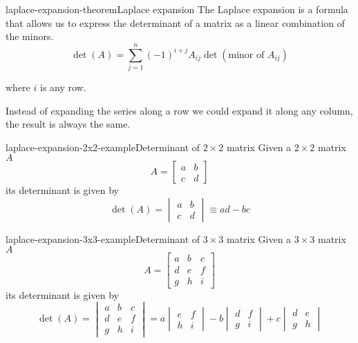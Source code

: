 \documentclass[preview]{standalone}
\begin{document}
\begin{snippettheorem}{laplace-expansion-theorem}{Laplace expansion}
    The Laplace expansion is a formula that allows us to express the determinant of
    a matrix as a linear combination of the minors.
    \[
        \det(A)=\sum_{j=1}^{n}{(-1)}^{i+j}A_{ij}\det(\text{minor of }A_{ij})
    \]

    where \(i\) is any row.

    Instead of expanding the series along a row we could expand it along any column,
    the result is always the same.
\end{snippettheorem}

\begin{snippetexample}{laplace-expansion-2x2-example}{Determinant of \(2\times2\) matrix}
    Given a \(2 \times 2\) matrix \(A\)
    \[
        A=
        \begin{bmatrix}
            a & b \\
            c & d
        \end{bmatrix}
    \]
    its determinant is given by
    \[
        \det(A)=
        \begin{vmatrix}
            a & b \\
            c & d
        \end{vmatrix}
        \equiv ad-bc
    \]
    \phantom{}
\end{snippetexample}

\begin{snippetexample}{laplace-expansion-3x3-example}{Determinant of \(3\times3\) matrix}
    Given a \(3 \times 3\) matrix \(A\)
    \[
        A=
        \begin{bmatrix}
            a & b & c \\
            d & e & f \\
            g & h & i
        \end{bmatrix}
    \]
    its determinant is given by
    \[
        \det(A)=
        \begin{vmatrix}
            a & b & c \\
            d & e & f \\
            g & h & i
        \end{vmatrix}
        =
        a \begin{vmatrix}
            e & f \\
            h & i
        \end{vmatrix}
        -b \begin{vmatrix}
            d & f \\
            g & i
        \end{vmatrix}
        +c \begin{vmatrix}
            d & e \\
            g & h
        \end{vmatrix}
    \]
    \phantom{}
\end{snippetexample}
\end{document}
